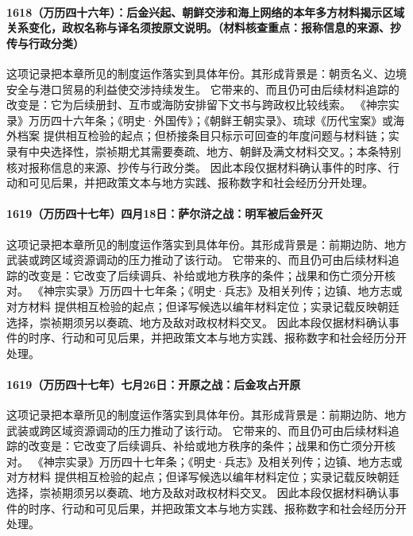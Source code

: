 \paragraph{1618（万历四十六年）：后金兴起、朝鲜交涉和海上网络的本年多方材料揭示区域关系变化，政权名称与译名须按原文说明。（材料核查重点：报称信息的来源、抄传与行政分类）} 这项记录把本章所见的制度运作落实到具体年份。其形成背景是：朝贡名义、边境安全与港口贸易的利益使交涉持续发生。 它带来的、而且仍可由后续材料追踪的改变是：它为后续册封、互市或海防安排留下文书与跨政权比较线索。 《神宗实录》万历四十六年条；《明史·外国传》；《朝鲜王朝实录》、琉球《历代宝案》或海外档案 提供相互检验的起点；但桥接条目只标示可回查的年度问题与材料链；实录有中央选择性，崇祯期尤其需要奏疏、地方、朝鲜及满文材料交叉。；本条特别核对报称信息的来源、抄传与行政分类。 因此本段仅据材料确认事件的时序、行动和可见后果，并把政策文本与地方实践、报称数字和社会经历分开处理。

\paragraph{1619（万历四十七年）四月18日：萨尔浒之战：明军被后金歼灭} 这项记录把本章所见的制度运作落实到具体年份。其形成背景是：前期边防、地方武装或跨区域资源调动的压力推动了该行动。 它带来的、而且仍可由后续材料追踪的改变是：它改变了后续调兵、补给或地方秩序的条件；战果和伤亡须分开核对。 《神宗实录》万历四十七年条；《明史·兵志》及相关列传；边镇、地方志或对方材料 提供相互检验的起点；但译写候选以编年材料定位；实录记载反映朝廷选择，崇祯期须另以奏疏、地方及敌对政权材料交叉。 因此本段仅据材料确认事件的时序、行动和可见后果，并把政策文本与地方实践、报称数字和社会经历分开处理。

\paragraph{1619（万历四十七年）七月26日：开原之战：后金攻占开原} 这项记录把本章所见的制度运作落实到具体年份。其形成背景是：前期边防、地方武装或跨区域资源调动的压力推动了该行动。 它带来的、而且仍可由后续材料追踪的改变是：它改变了后续调兵、补给或地方秩序的条件；战果和伤亡须分开核对。 《神宗实录》万历四十七年条；《明史·兵志》及相关列传；边镇、地方志或对方材料 提供相互检验的起点；但译写候选以编年材料定位；实录记载反映朝廷选择，崇祯期须另以奏疏、地方及敌对政权材料交叉。 因此本段仅据材料确认事件的时序、行动和可见后果，并把政策文本与地方实践、报称数字和社会经历分开处理。

